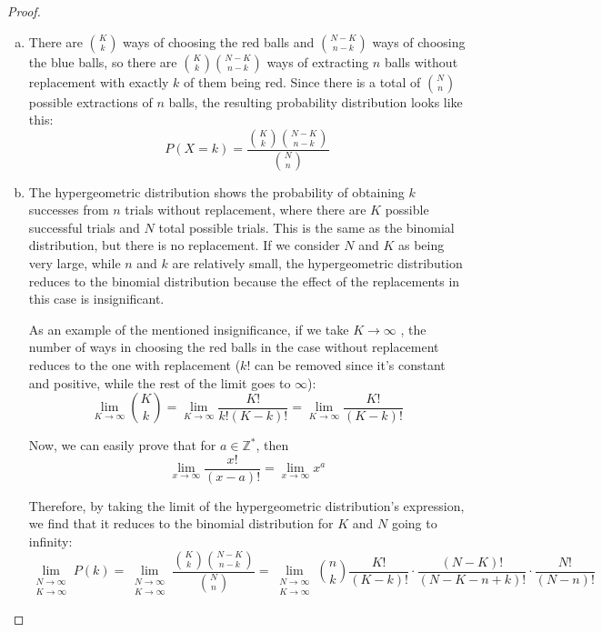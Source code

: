 \vspace{2em}

\begin{proof}
    \hfill
    \begin{enumerate}[(a)]
        \item There are $\binom{K}{k}$ ways of choosing the red balls and $\binom{N - K}{n - k}$ ways
            of choosing the blue balls, so there are $\binom{K}{k} \binom{N - K}{n - k}$ ways of
            extracting $n$ balls without replacement with exactly $k$ of them being red. Since
            there is a total of $\binom{N}{n}$ possible extractions of $n$ balls, the resulting
            probability distribution looks like this:
            \[
                P(X = k) = \frac{\binom{K}{k}\binom{N - K}{n - k}}{\binom{N}{n}}
            \] 

        \item The hypergeometric distribution shows the probability of obtaining 
            $k$ successes from $n$ trials without replacement, where there are 
            $K$ possible successful trials and $N$ total possible trials. 
            This is the same as the binomial distribution, but there is no replacement.
            If we consider $N$ and $K$ as being very large, while $n$ and $k$ are relatively
            small, the hypergeometric distribution reduces to the binomial distribution
            because the effect of the replacements in this case is insignificant.

            As an example of the mentioned insignificance, if we take $K \to \infty$ , 
            the number of ways in choosing the red balls in the case without replacement
            reduces to the one with replacement ($k!$ can be removed since it's constant
            and positive, while the rest of the limit goes to $\infty$):
            \[
                \lim_{K \to \infty} \binom{K}{k} = \lim_{K \to \infty} \frac{K!}{k!(K - k)!} =
                \lim_{K \to \infty} \frac{K!}{(K - k)!}
            \] 

            Now, we can easily prove that for $a \in \mathbb{Z}^*$, then
            \begin{equation*}\tag{4.6.1}
                \lim_{x \to \infty} {\frac{x!}{(x - a)!}} = \lim_{x \to \infty} x^a
            \end{equation*}

            Therefore, by taking the limit of the hypergeometric distribution's
            expression, we find that it reduces to the binomial distribution for
            $K$ and $N$ going to infinity:
            \[
                \lim_{\substack{N \to \infty \\ K \to \infty}} P(k) 
                = \lim_{\substack{N \to \infty \\ K \to \infty}} 
                    \frac{\binom{K}{k}\binom{N - K}{n - k}}{\binom{N}{n}}
                = \lim_{\substack{N \to \infty \\ K \to \infty}} 
                    \binom{n}{k} \frac{K!}{(K - k)!} \cdot \frac{(N - K)!}{(N - K - n + k)!} 
                        \cdot \frac{N!}{(N - n)!}
            \]


\end{enumerate}
\end{proof}
